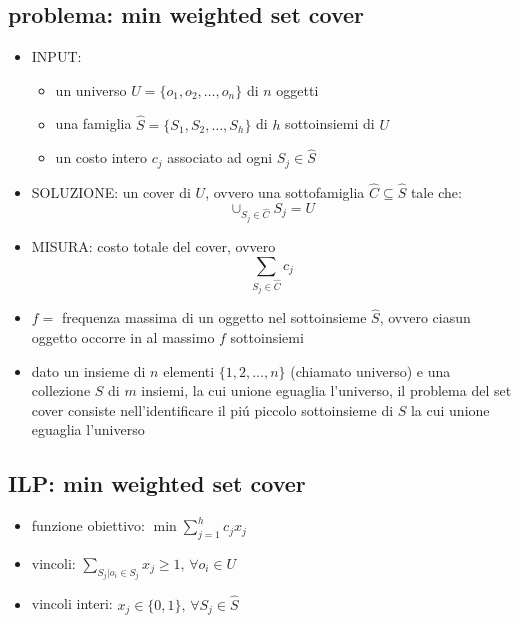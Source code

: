 
\subsection*{problema: min weighted set cover}
\begin{flushleft}
	\begin{itemize}
		\item INPUT:
		\begin{itemize}
			\item un universo $U=\{o_1,o_2,\ldots,o_n\}$ di $n$ oggetti
			\item una famiglia $\hat{S}=\{S_1,S_2,\ldots,S_h\}$ di $h$ sottoinsiemi di $U$
			\item un costo intero $c_j$ associato ad ogni $S_j\in \hat{S}$
		\end{itemize}
		\item SOLUZIONE: un cover di $U$, ovvero una sottofamiglia $\hat{C}\subseteq\hat{S}$ tale che:
			$$\cup_{S_j\in\hat{C}}S_j=U$$
		\item MISURA: costo totale del cover, ovvero
			$$\sum_{S_j\in\hat{C}}c_j$$
	\end{itemize}
	\vspace{0.5cm}
	\begin{itemize}
		\item $f=$ frequenza massima di un oggetto nel sottoinsieme $\hat{S}$, ovvero ciasun oggetto occorre in al massimo $f$ sottoinsiemi
		\item dato un insieme di $n$ elementi $\{1,2,\ldots,n\}$ (chiamato universo) e una collezione $S$ di $m$ insiemi, la cui unione eguaglia l'universo, il problema del set cover consiste nell'identificare il pi\'u piccolo sottoinsieme di $S$ la cui unione eguaglia l'universo
	\end{itemize}
\end{flushleft}


\subsection*{ILP: min weighted set cover}
\begin{flushleft}
	\begin{itemize}
		\item funzione obiettivo: $\min\sum_{j=1}^h c_jx_j$
		\item vincoli: $\sum_{S_j\vert o_i\in S_j}x_j\geq 1\text{, }\forall o_i\in U$
		\item vincoli interi: $x_j\in\{0,1\}\text{, }\forall S_j\in\hat{S}$
	\end{itemize}
\end{flushleft}

